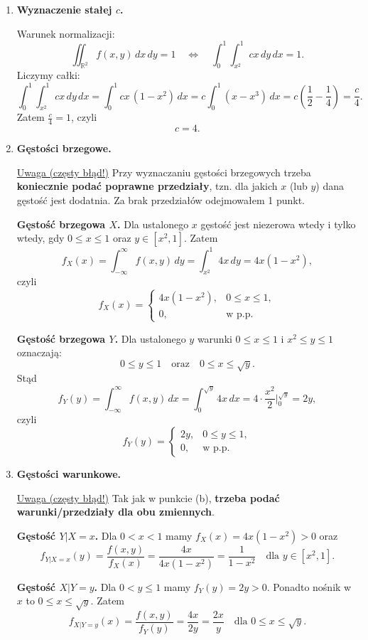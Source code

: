 \documentclass[polish, 10pt]{extarticle}
\begin{document}
\begin{enumerate}
\item[a)] \textbf{Wyznaczenie stałej $c$.}

Warunek normalizacji:
\[
\iint_{\mathbb{R}^2} f(x,y)\,dx\,dy=1
\quad\Longleftrightarrow\quad
\int_{0}^{1}\int_{x^2}^{1} cx\,dy\,dx=1.
\]
Liczymy całki:
\[
\int_{0}^{1}\int_{x^2}^{1} cx\,dy\,dx
=\int_{0}^{1} cx\,(1-x^2)\,dx
=c\int_{0}^{1}(x-x^3)\,dx
=c\left(\frac12-\frac14\right)=\frac{c}{4}.
\]
Zatem $\frac{c}{4}=1$, czyli
\[
\boxed{c=4.}
\]

\item[b)] \textbf{Gęstości brzegowe.}

\underline{Uwaga (częsty błąd!)} Przy wyznaczaniu gęstości brzegowych trzeba \textbf{koniecznie podać poprawne przedziały}, tzn. dla jakich $x$ (lub $y$) dana gęstość jest dodatnia. Za brak przedziałów odejmowałem 1 punkt.

\smallskip
\textbf{Gęstość brzegowa $X$.}
Dla ustalonego $x$ gęstość jest niezerowa wtedy i tylko wtedy, gdy $0\le x\le 1$ oraz $y\in[x^2,1]$. Zatem
\[
f_X(x)=\int_{-\infty}^{\infty} f(x,y)\,dy=\int_{x^2}^{1} 4x\,dy
=4x(1-x^2),
\]
czyli
\[
\boxed{
f_X(x)=
\begin{cases}
4x(1-x^2), & 0\le x\le 1,\\
0, & \text{w p.p.}
\end{cases}}
\]

\smallskip
\textbf{Gęstość brzegowa $Y$.}
Dla ustalonego $y$ warunki $0\le x\le 1$ i $x^2\le y\le 1$ oznaczają:
\[
0\le y\le 1
\quad\text{oraz}\quad
0\le x\le \sqrt{y}.
\]
Stąd
\[
f_Y(y)=\int_{-\infty}^{\infty} f(x,y)\,dx=\int_{0}^{\sqrt{y}} 4x\,dx
=4\cdot \frac{x^2}{2}\Big|_{0}^{\sqrt{y}}=2y,
\]
czyli
\[
\boxed{
f_Y(y)=
\begin{cases}
2y, & 0\le y\le 1,\\
0, & \text{w p.p.}
\end{cases}}
\]

\item[c)] \textbf{Gęstości warunkowe.}

\underline{Uwaga (częsty błąd!)} Tak jak w punkcie (b), \textbf{trzeba podać warunki/przedziały dla obu zmiennych}.

\smallskip
\textbf{Gęstość $Y|X=x$.}
Dla $0<x<1$ mamy $f_X(x)=4x(1-x^2)>0$ oraz
\[
f_{Y|X=x}(y)=\frac{f(x,y)}{f_X(x)}
=\frac{4x}{4x(1-x^2)}=\frac{1}{1-x^2} \quad\text{dla } y\in[x^2,1].
\]

\smallskip
\textbf{Gęstość $X|Y=y$.}
Dla $0<y\le 1$ mamy $f_Y(y)=2y>0$. Ponadto nośnik w $x$ to $0\le x\le \sqrt{y}$. Zatem
\[
f_{X|Y=y}(x)=\frac{f(x,y)}{f_Y(y)}=\frac{4x}{2y}=\frac{2x}{y}
\quad\text{dla } 0\le x\le \sqrt{y}.
\]


\end{enumerate}
\end{document}
